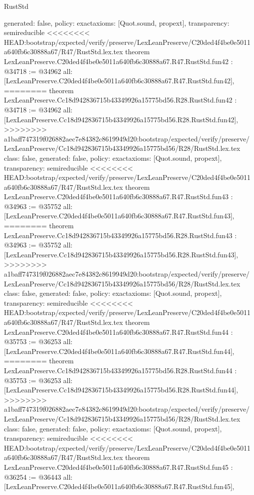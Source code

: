 \begin{lexlean}{RustStd}
\begin{coremodule}
{\begin{coremodule}
{{{{{{{{{{{{{{{{{{{{{{{{{{{{{{{{{{{{{{{{{{{{{  generated: false,
  policy: exact{axioms: [Quot.sound, propext]},
  transparency: semireducible
}
<<<<<<<< HEAD:bootstrap/expected/verify/preserve/LexLeanPreserve/C20ded4f4be0e5011a640fb6c30888a67/R47/RustStd.lex.tex
theorem LexLeanPreserve.C20ded4f4be0e5011a640fb6c30888a67.R47.RustStd.fun42 : @34718 := @34962 {
  all: [LexLeanPreserve.C20ded4f4be0e5011a640fb6c30888a67.R47.RustStd.fun42],
========
theorem LexLeanPreserve.Cc18d942836715b43349926a15775bd56.R28.RustStd.fun42 : @34718 := @34962 {
  all: [LexLeanPreserve.Cc18d942836715b43349926a15775bd56.R28.RustStd.fun42],
>>>>>>>> a1baff747319f026882aec7e84382c8619949d20:bootstrap/expected/verify/preserve/LexLeanPreserve/Cc18d942836715b43349926a15775bd56/R28/RustStd.lex.tex
  class: false,
  generated: false,
  policy: exact{axioms: [Quot.sound, propext]},
  transparency: semireducible
}
<<<<<<<< HEAD:bootstrap/expected/verify/preserve/LexLeanPreserve/C20ded4f4be0e5011a640fb6c30888a67/R47/RustStd.lex.tex
theorem LexLeanPreserve.C20ded4f4be0e5011a640fb6c30888a67.R47.RustStd.fun43 : @34963 := @35752 {
  all: [LexLeanPreserve.C20ded4f4be0e5011a640fb6c30888a67.R47.RustStd.fun43],
========
theorem LexLeanPreserve.Cc18d942836715b43349926a15775bd56.R28.RustStd.fun43 : @34963 := @35752 {
  all: [LexLeanPreserve.Cc18d942836715b43349926a15775bd56.R28.RustStd.fun43],
>>>>>>>> a1baff747319f026882aec7e84382c8619949d20:bootstrap/expected/verify/preserve/LexLeanPreserve/Cc18d942836715b43349926a15775bd56/R28/RustStd.lex.tex
  class: false,
  generated: false,
  policy: exact{axioms: [Quot.sound, propext]},
  transparency: semireducible
}
<<<<<<<< HEAD:bootstrap/expected/verify/preserve/LexLeanPreserve/C20ded4f4be0e5011a640fb6c30888a67/R47/RustStd.lex.tex
theorem LexLeanPreserve.C20ded4f4be0e5011a640fb6c30888a67.R47.RustStd.fun44 : @35753 := @36253 {
  all: [LexLeanPreserve.C20ded4f4be0e5011a640fb6c30888a67.R47.RustStd.fun44],
========
theorem LexLeanPreserve.Cc18d942836715b43349926a15775bd56.R28.RustStd.fun44 : @35753 := @36253 {
  all: [LexLeanPreserve.Cc18d942836715b43349926a15775bd56.R28.RustStd.fun44],
>>>>>>>> a1baff747319f026882aec7e84382c8619949d20:bootstrap/expected/verify/preserve/LexLeanPreserve/Cc18d942836715b43349926a15775bd56/R28/RustStd.lex.tex
  class: false,
  generated: false,
  policy: exact{axioms: [Quot.sound, propext]},
  transparency: semireducible
}
<<<<<<<< HEAD:bootstrap/expected/verify/preserve/LexLeanPreserve/C20ded4f4be0e5011a640fb6c30888a67/R47/RustStd.lex.tex
theorem LexLeanPreserve.C20ded4f4be0e5011a640fb6c30888a67.R47.RustStd.fun45 : @36254 := @36443 {
  all: [LexLeanPreserve.C20ded4f4be0e5011a640fb6c30888a67.R47.RustStd.fun45],
}}}}}}}}}}}}}}}}}}}}}}}}}}}}}}}}}}}}}}}}}}}}}}}}
\end{coremodule}}
\end{coremodule}
\end{lexlean}
